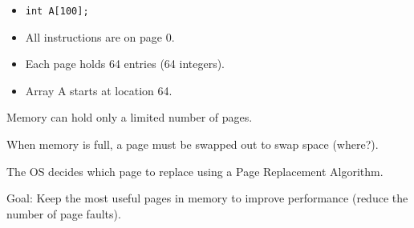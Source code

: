 \begin{slide}

	
	\vspace{-5mm}
	
	\begin{itemize}
		\item \texttt{int A[100];}
		\item All instructions are on page 0.
		\item Each page holds 64 entries (64 integers). 
		\item Array A starts at location 64. 
	\end{itemize}
	
\end{slide}

\begin{slide}

	
	Memory can hold only a limited number of pages.
	
	\medskip

	When memory is full, a page must be swapped out to swap space (where?).
	
	\medskip
	
	The OS decides which page to replace using a Page Replacement Algorithm.

	\medskip
	
	Goal: Keep the most useful pages in memory to improve performance (reduce the number of page faults).

\end{slide}

